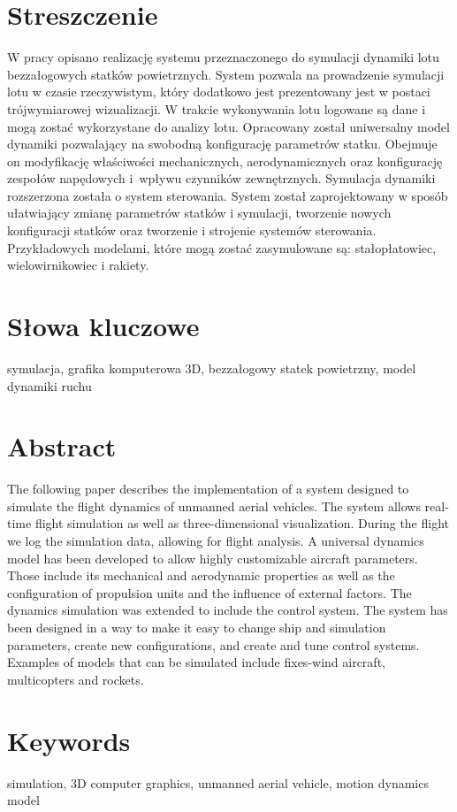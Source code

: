 \section*{Streszczenie}
W pracy opisano realizację systemu przeznaczonego do symulacji dynamiki lotu bezzałogowych statków powietrznych. System pozwala na prowadzenie symulacji lotu w czasie rzeczywistym, który dodatkowo jest prezentowany jest w postaci trójwymiarowej wizualizacji. W trakcie wykonywania lotu logowane są dane i mogą zostać wykorzystane do analizy lotu. Opracowany został uniwersalny model dynamiki pozwalający na swobodną konfigurację parametrów statku. Obejmuje on modyfikację właściwości mechanicznych, aerodynamicznych oraz konfigurację zespołów napędowych i~wpływu czynników zewnętrznych. Symulacja dynamiki rozszerzona została o system sterowania. System został zaprojektowany w sposób ułatwiający zmianę parametrów statków i symulacji, tworzenie nowych konfiguracji statków oraz tworzenie i strojenie systemów sterowania. Przykładowych modelami, które mogą zostać zasymulowane są: stałopłatowiec, wielowirnikowiec i rakiety.

\section*{Słowa kluczowe}

symulacja, grafika komputerowa 3D, bezzałogowy statek powietrzny, model dynamiki ruchu

\newpage

\section*{Abstract}

The following paper describes the implementation of a system designed to simulate the flight dynamics of unmanned aerial vehicles. The system allows real-time flight simulation as well as three-dimensional visualization. During the flight we log the simulation data, allowing for flight analysis. A universal dynamics model has been developed to allow highly customizable aircraft parameters. Those include its mechanical and aerodynamic properties as well as the configuration of propulsion units and the influence of external factors. The dynamics simulation was extended to include the control system. The system has been designed in a way to make it easy to change ship and simulation parameters, create new configurations, and create and tune control systems. Examples of models that can be simulated include fixes-wind aircraft, multicopters and rockets.

\section*{Keywords}

simulation, 3D computer graphics, unmanned aerial vehicle, motion dynamics model

\newpage
\tableofcontents